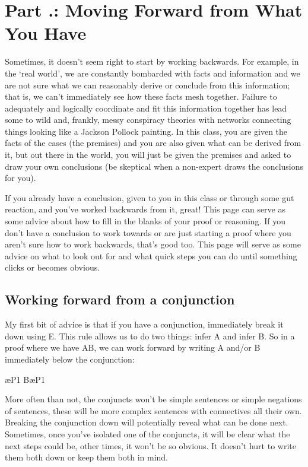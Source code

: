 \section{Part \thechapcount.\theseccount: Moving Forward from What You Have}

Sometimes, it doesn't seem right to start by working backwards. For example, in the `real world', we are constantly bombarded with facts and information and we are not sure what we can reasonably derive or conclude from this information; that is, we can't immediately see how these facts mesh together. Failure to adequately and logically coordinate and fit this information together has lead some to wild and, frankly, messy conspiracy theories with networks connecting things looking like a Jackson Pollock painting. In this class, you are given the facts of the cases (the premises) and you are also given what can be derived from it, but out there in the world, you will just be given the premises and asked to draw your own conclusions (be skeptical when a non-expert draws the conclusions for you).

If you already have a conclusion, given to you in this class or through some gut reaction, and you've worked backwards from it, great! This page can serve as some advice about how to fill in the blanks of your proof or reasoning. If you don't have a conclusion to work towards or are just starting a proof where you aren't sure how to work backwards, that's good too. This page will serve as some advice on what to look out for and what quick steps you can do until something clicks or becomes obvious.

\subsection{Working forward from a conjunction}

My first bit of advice is that if you have a conjunction, immediately break it down using \eand E. This rule allows us to do two things: infer A and infer B. So in a proof where we have A\eand B, we can work forward by writing A and/or B immediately below the conjunction:
\begin{fitchproof}
\ae{P1}
B\ae{P1}	
\end{fitchproof}

More often than not, the conjuncts won't be simple sentences or simple negations of sentences, these will be more complex sentences with connectives all their own. Breaking the conjunction down will potentially reveal what can be done next. Sometimes, once you've isolated one of the conjuncts, it will be clear what the next steps could be, other times, it won't be so obvious. It doesn't hurt to write them both down or keep them both in mind.

